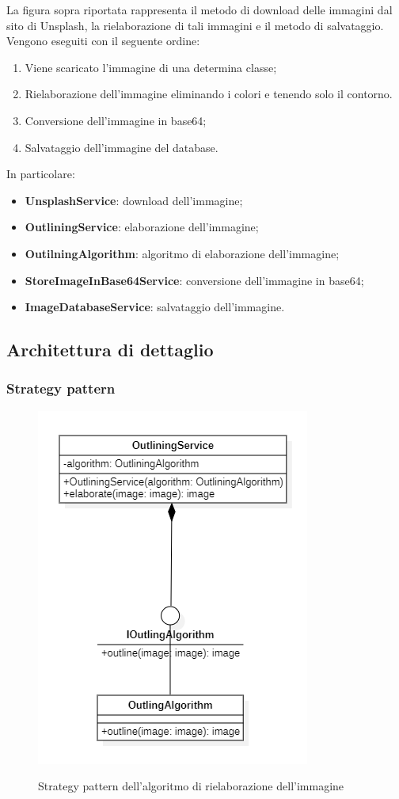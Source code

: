 La figura sopra riportata rappresenta il metodo di download delle immagini dal sito di Unsplash, la rielaborazione di tali immagini e
il metodo di salvataggio. Vengono eseguiti con il seguente ordine:
\begin{enumerate}
    \item Viene scaricato l'immagine di una determina classe;
    \item Rielaborazione dell'immagine eliminando i colori e tenendo solo il contorno.
    \item Conversione dell'immagine in base64;
    \item Salvataggio dell'immagine del database.
\end{enumerate}

In particolare:
\begin{itemize}
    \item \textbf{UnsplashService}: download dell'immagine;
    \item \textbf{OutliningService}: elaborazione dell'immagine;
    \item \textbf{OutilningAlgorithm}: algoritmo di elaborazione dell'immagine;
    \item \textbf{StoreImageInBase64Service}: conversione dell'immagine in base64;
    \item \textbf{ImageDatabaseService}: salvataggio dell'immagine.
\end{itemize}

\subsection{Architettura di dettaglio}

\subsubsection{Strategy pattern}

\begin{figure}[H]
    \centering
    \includegraphics[scale = 1.0]{img/outlineStrategy.png}\\
    \caption{Strategy pattern dell'algoritmo di rielaborazione dell'immagine}
\end{figure}

